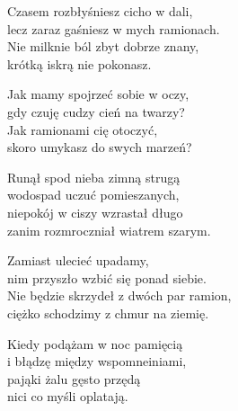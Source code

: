 \begin{text}
Czasem rozbłyśniesz cicho w dali,\\
lecz zaraz gaśniesz w mych ramionach.\\
Nie milknie ból zbyt dobrze znany,\\
krótką iskrą nie pokonasz.

Jak mamy spojrzeć sobie w oczy,\\
gdy czuję cudzy cień na twarzy?\\
Jak ramionami cię otoczyć,\\
skoro umykasz do swych marzeń?

Runął spod nieba zimną strugą\\
wodospad uczuć pomieszanych,\\
niepokój w ciszy wzrastał długo\\
zanim rozmroczniał wiatrem szarym.

Zamiast ulecieć upadamy,\\
nim przyszło wzbić się ponad siebie.\\
Nie będzie skrzydeł z dwóch par ramion,\\
ciężko schodzimy z chmur na ziemię.

Kiedy podążam w noc pamięcią\\
i błądzę między wspomneiniami,\\
pająki żalu gęsto przędą\\
nici co myśli oplatają.
\end{text}
\begin{chord}

\end{chord}